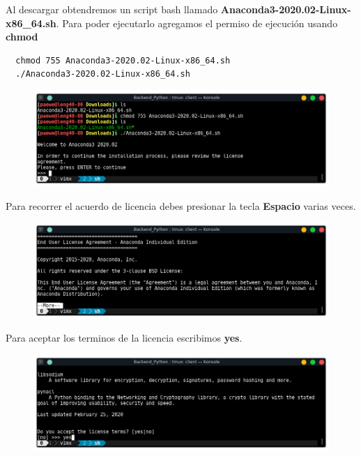 \documentclass{article}
\begin{document}
Al descargar obtendremos un script bash llamado
\textbf{Anaconda3-2020.02-Linux-x86\_64.sh}. Para poder ejecutarlo agregamos el
permiso de ejecución usando \textbf{chmod}\\

\begin{verbatim}
  chmod 755 Anaconda3-2020.02-Linux-x86_64.sh
  ./Anaconda3-2020.02-Linux-x86_64.sh
\end{verbatim}


\begin{figure}[h!]
  \centering
  \includegraphics[scale=0.75]{./Pictures/003_install_anaconda.png}
\end{figure}

Para recorrer el acuerdo de licencia debes presionar la tecla \textbf{Espacio}
varias veces.

\begin{figure}[h!]
  \centering
  \includegraphics[scale=0.75]{./Pictures/004_licencia_more.png}
\end{figure}

\newpage

Para aceptar los terminos de la licencia escribimos \textbf{yes}.

\begin{figure}[h!]
  \centering
  \includegraphics[scale=0.75]{./Pictures/005_aceptar_licencia.png}
\end{figure}
\end{document}
